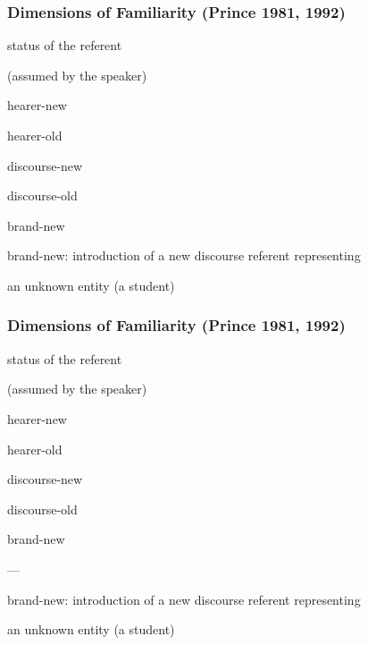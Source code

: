 \documentclass[compress,color=usenames]{beamer}
\begin{document}
\begin{frame}
\frametitle{
Dimensions of Familiarity (Prince 1981, 1992)}



status of the referent



(assumed by the speaker)



hearer-new



hearer-old






discourse-new






discourse-old






brand-new






brand-new: introduction of a new discourse referent representing



an unknown entity (a student)










\end{frame}
\begin{frame}
\frametitle{
Dimensions of Familiarity (Prince 1981, 1992)}



status of the referent



(assumed by the speaker)



hearer-new



hearer-old






discourse-new






discourse-old






brand-new





---






brand-new: introduction of a new discourse referent representing



an unknown entity (a student)










\end{frame}
\end{document}
